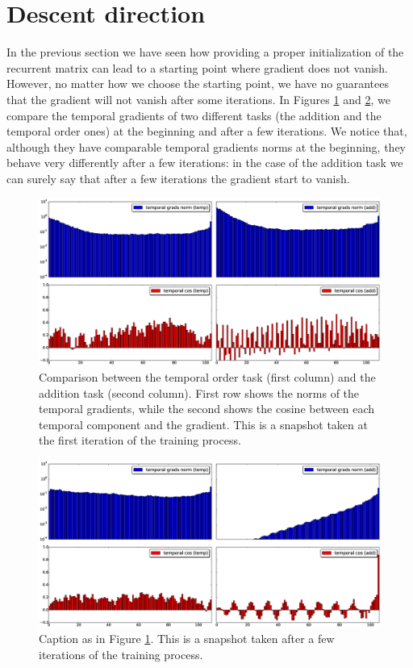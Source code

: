 \section{Descent direction}
In the previous section we have seen how providing a proper initialization of the recurrent matrix can lead to a starting point where gradient does not vanish. However, no matter how we choose the starting point, we have no guarantees that the gradient will not vanish after some iterations. In Figures \ref{fig:comparison_add_temp_0} and \ref{fig:comparison_add_temp_1}, we compare the temporal gradients of two different tasks (the addition and the temporal order ones) at the beginning and after a few iterations.
We notice that, although they have comparable temporal gradients norms at the beginning, they behave very differently after a few iterations: in the case of the addition task we can surely say that after a few iterations the gradient start to vanish.

\begin{figure}[h]
	\includegraphics[width=1\textwidth]{chapter3/compare_add_temp_norms_0.eps}
	\caption{Comparison between the temporal order task (first column) and the addition task (second column). First row shows the norms of the temporal gradients, while the second shows the cosine between each temporal component and the gradient. This is a snapshot taken at the first iteration of the training process.}
	\label{fig:comparison_add_temp_0}
\end{figure}

\begin{figure}[h]
	\includegraphics[width=1\textwidth]{chapter3/compare_add_temp_norms_1.eps}
	\caption{Caption as in Figure \ref{fig:comparison_add_temp_0}. This is a snapshot taken after a few iterations of the training process.}
	\label{fig:comparison_add_temp_1}
\end{figure}


